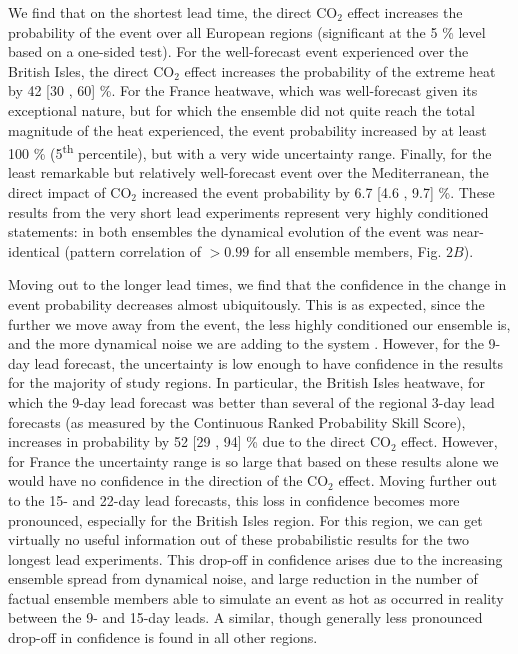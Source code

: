   We find that on the shortest lead time, the direct CO$_2$ effect increases the probability of the event over all European regions (significant at the 5 \% level based on a one-sided test). For the well-forecast event experienced over the British Isles, the direct CO$_2$ effect increases the probability of the extreme heat by 42 [30 , 60] \%. For the France heatwave, which was well-forecast given its exceptional nature, but for which the ensemble did not quite reach the total magnitude of the heat experienced, the event probability increased by at least 100 \% (5\textsuperscript{th} percentile), but with a very wide uncertainty range. Finally, for the least remarkable but relatively well-forecast event over the Mediterranean, the direct impact of CO$_2$ increased the event probability by 6.7 [4.6 , 9.7] \%. These results from the very short lead experiments represent very highly conditioned statements: in both ensembles the dynamical evolution of the event was near-identical (pattern correlation of $>0.99$ for all ensemble members, Fig. $2B$).
  
  Moving out to the longer lead times, we find that the confidence in the change in event probability decreases almost ubiquitously. This is as expected, since the further we move away from the event, the less highly conditioned our ensemble is, and the more dynamical noise we are adding to the system \citep{shepherd_common_2016}. However, for the 9-day lead forecast, the uncertainty is low enough to have confidence in the results for the majority of study regions. In particular, the British Isles heatwave, for which the 9-day lead forecast was better than several of the regional 3-day lead forecasts (as measured by the Continuous Ranked Probability Skill Score), increases in probability by 52 [29 , 94] \% due to the direct CO$_2$ effect. However, for France the uncertainty range is so large that based on these results alone we would have no confidence in the direction of the CO$_2$ effect. Moving further out to the 15- and 22-day lead forecasts, this loss in confidence becomes more pronounced, especially for the British Isles region. For this region, we can get virtually no useful information out of these probabilistic results for the two longest lead experiments. This drop-off in confidence arises due to the increasing ensemble spread from dynamical noise, and large reduction in the number of factual ensemble members able to simulate an event as hot as occurred in reality between the 9- and 15-day leads. A similar, though generally less pronounced drop-off in confidence is found in all other regions. 
  
